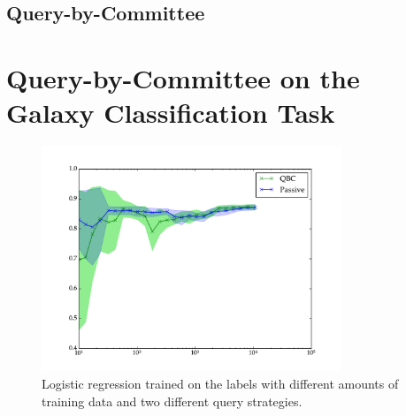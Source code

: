 

    \subsection{Query-by-Committee}
    \label{sec:qbc}

\section{Query-by-Committee on the Galaxy Classification Task}
\label{sec:rgz-qbc}

    \begin{figure}
        \centering
        \includegraphics[width=0.8\textwidth]
            {images/experiments/rgz_qbc.pdf}
        \caption{Logistic regression trained on the \citeauthor{norris06}
            labels with different amounts of training data and two different
            query strategies.}
        \label{fig:rgz-qbc}
    \end{figure}